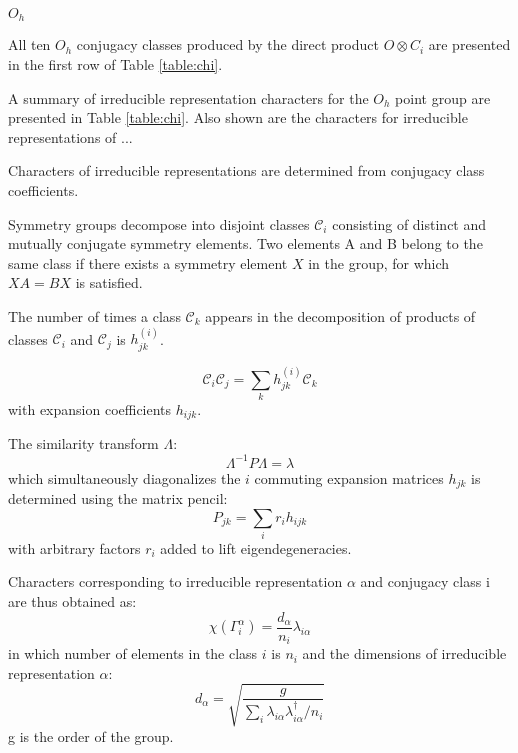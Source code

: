 \documentclass[twocolumn,showpacs,preprintnumbers,superscriptaddress,prb,floatfix,aps,10pt]{revtex4-1}
\newcommand*{\class}{\mathcal{C}}
\begin{document}
$O_h$



All ten $O_h$ conjugacy classes produced by the direct product $O \otimes C_i$ are presented in the first row of Table \ref{table:chi}.




A summary of irreducible representation characters for the $O_h$ point group are presented in 
Table \ref{table:chi}. Also shown are the characters for irreducible representations of ... 

Characters of irreducible representations are determined from conjugacy class coefficients\cite{burnside_theory_2010,mckay_construction_1970,unger_computing_2006,schneider_dixons_1990,dixon_high_1967}.

Symmetry groups decompose into disjoint classes $\class_i$ consisting of distinct and mutually conjugate symmetry elements. Two elements A and B belong to the same class if there exists a symmetry element $X$ in the group, for which $XA = BX$ is satisfied.

The number of times a class $\class_k$ appears in the decomposition of products of classes $\class_i$ and $\class_j$ is $h_{jk}^{(i)}$. 

\begin{equation}
\label{eq:class_coefficients}
\class_i \class_j = \sum_k h_{jk}^{(i)} \class_k
\end{equation}
with expansion coefficients $h_{ijk}$.

The similarity transform $\Lambda$:
\begin{equation}
\Lambda^{-1} P \Lambda = \lambda
\end{equation}
which simultaneously diagonalizes the $i$ commuting expansion matrices $h_{jk}$ is determined using the matrix pencil:
\begin{equation}
\label{eq:matrix_pencil}
P_{jk} = \sum_i r_i h_{ijk}
\end{equation}
with arbitrary factors $r_i$ added to lift eigendegeneracies.


Characters corresponding to irreducible representation $\alpha$ and conjugacy class i are thus obtained as:
\begin{equation}
\label{eq:irrep_characters}
\chi\left(\Gamma_i^\alpha\right) = \frac{d_\alpha}{n_i} \lambda_{i\alpha}
\end{equation}
in which number of elements in the class $i$ is $n_i$ and the dimensions of irreducible representation $\alpha$:
\begin{equation}
\label{eq:irrep_dimension}
d_\alpha = \sqrt{ \frac{g}{\sum_i \lambda_{i\alpha} \lambda_{i\alpha}^\dag / n_i }  }
\end{equation}
g is the order of the group.
\end{document}
